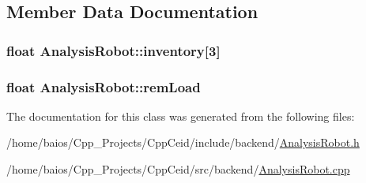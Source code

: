 \subsection{Member Data Documentation}
\hypertarget{class_analysis_robot_a1cc3b0734f5e183c01aedf9fb563e9bb}{
\subsubsection[{inventory}]{\setlength{\rightskip}{0pt plus 5cm}float Analysis\-Robot\-::inventory\mbox{[}3\mbox{]}}}\label{class_analysis_robot_a1cc3b0734f5e183c01aedf9fb563e9bb}
\hypertarget{class_analysis_robot_a14ed4ba869e1dedc9100c1ce357b235d}{
\subsubsection[{rem\-Load}]{\setlength{\rightskip}{0pt plus 5cm}float Analysis\-Robot\-::rem\-Load}}\label{class_analysis_robot_a14ed4ba869e1dedc9100c1ce357b235d}


The documentation for this class was generated from the following files\-:\begin{DoxyCompactItemize}
\item 
/home/baios/\-Cpp\-\_\-\-Projects/\-Cpp\-Ceid/include/backend/\hyperlink{_analysis_robot_8h}{Analysis\-Robot.\-h}\item 
/home/baios/\-Cpp\-\_\-\-Projects/\-Cpp\-Ceid/src/backend/\hyperlink{_analysis_robot_8cpp}{Analysis\-Robot.\-cpp}\end{DoxyCompactItemize}
